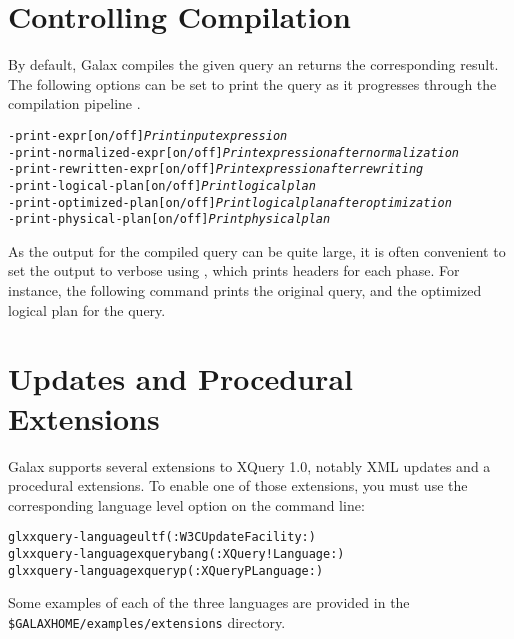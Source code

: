 \section{Controlling Compilation}

By default, Galax compiles the given query an returns the
corresponding result. The following options can be set to print the
query as it progresses through the compilation pipeline .

\begin{alltt}
  -print-expr [on/off] \emph{Print input expression}
  -print-normalized-expr [on/off] \emph{Print expression after normalization}
  -print-rewritten-expr [on/off] \emph{Print expression after rewriting}
  -print-logical-plan [on/off] \emph{Print logical plan}
  -print-optimized-plan [on/off] \emph{Print logical plan after optimization}
  -print-physical-plan [on/off] \emph{Print physical plan}
\end{alltt}

As the output for the compiled query can be quite large, it is often
convenient to set the output to verbose using ,
which prints headers for each phase. For instance, the following
command prints the original query, and the optimized logical plan for
the query.

\begin{alltt}
% glx xquery docnode.xq -verbose on -print-expr on -print-optimized-plan on
\end{alltt}

\section{Updates and Procedural Extensions}

Galax supports several extensions to XQuery 1.0, notably XML updates
and a procedural extensions. To enable one of those extensions, you
must use the corresponding language level option on the command line:

\begin{alltt}
glx xquery -language ultf       (: W3C Update Facility :)
glx xquery -language xquerybang (: XQuery! Language :)
glx xquery -language xqueryp    (: XQueryP Language :)
\end{alltt}

Some examples of each of the three languages are provided in the
\verb+$GALAXHOME/examples/extensions+ directory.
